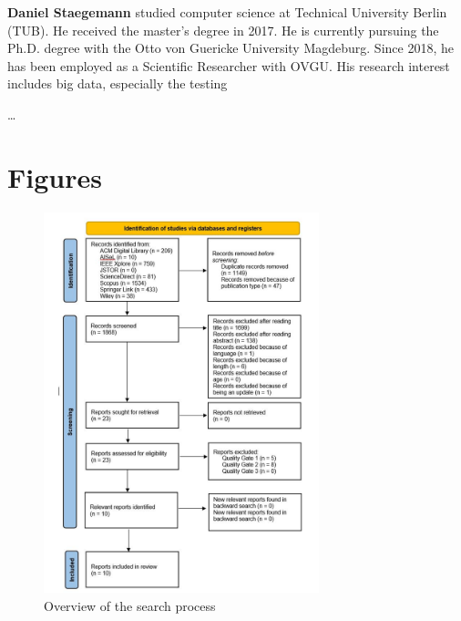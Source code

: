 \documentclass{bmcart}
\begin{document}
\begin{backmatter}
\textbf{Daniel Staegemann} studied computer science at Technical University
Berlin (TUB). He received the master’s degree in 2017. He is currently
pursuing the Ph.D. degree with the Otto von Guericke University Magdeburg.
Since 2018, he has been employed as a Scientific Researcher with OVGU.
His research interest includes big data, especially the testing

\ldots





\section{Figures}

\begin{figure}[h]
    \centering 
    \includegraphics[width=8cm]{Media/PRISMA-Flowchart-V2.JPG}
    \caption{Overview of the search process}
    \label{fig:PRISMA}
\end{figure}


\end{backmatter}
\end{document}

